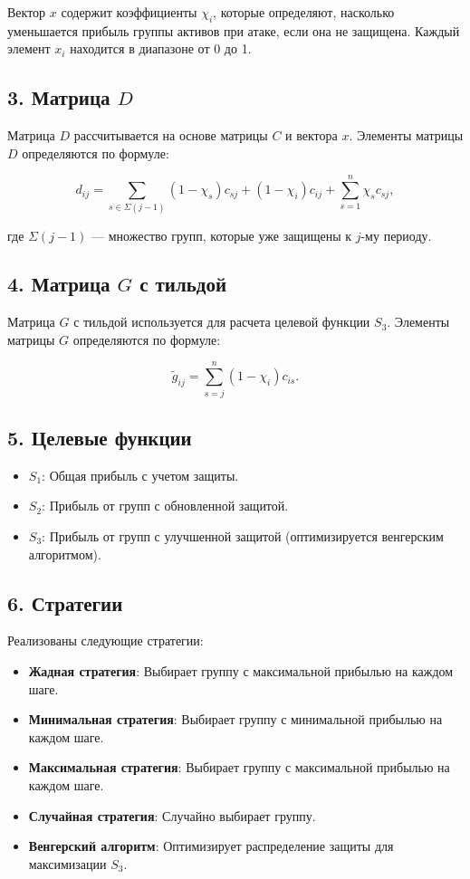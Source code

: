 \documentclass{article}
\begin{document}
Вектор \( x \) содержит коэффициенты \( \chi_i \), которые определяют, насколько уменьшается прибыль группы активов при атаке, если она не защищена. Каждый элемент \( x_i \) находится в диапазоне от 0 до 1.

\subsection*{3. Матрица \( D \)}

Матрица \( D \) рассчитывается на основе матрицы \( C \) и вектора \( x \). Элементы матрицы \( D \) определяются по формуле:

\[
d_{ij} = \sum_{s \in \Sigma(j-1)} (1 - \chi_s)c_{sj} + (1 - \chi_i)c_{ij} + \sum_{s=1}^n \chi_s c_{sj},
\]

где \( \Sigma(j-1) \) — множество групп, которые уже защищены к \( j \)-му периоду.

\subsection*{4. Матрица \( G \) с тильдой}

Матрица \( G \) с тильдой используется для расчета целевой функции \( S_3 \). Элементы матрицы \( G \) определяются по формуле:

\[
\widetilde{g}_{ij} = \sum_{s=j}^{n} (1 - \chi_i)c_{is}.
\]

\subsection*{5. Целевые функции}

\begin{itemize}
    \item \( S_1 \): Общая прибыль с учетом защиты.
    \item \( S_2 \): Прибыль от групп с обновленной защитой.
    \item \( S_3 \): Прибыль от групп с улучшенной защитой (оптимизируется венгерским алгоритмом).
\end{itemize}

\subsection*{6. Стратегии}

Реализованы следующие стратегии:
\begin{itemize}
    \item \textbf{Жадная стратегия}: Выбирает группу с максимальной прибылью на каждом шаге.
    \item \textbf{Минимальная стратегия}: Выбирает группу с минимальной прибылью на каждом шаге.
    \item \textbf{Максимальная стратегия}: Выбирает группу с максимальной прибылью на каждом шаге.
    \item \textbf{Случайная стратегия}: Случайно выбирает группу.
    \item \textbf{Венгерский алгоритм}: Оптимизирует распределение защиты для максимизации \( S_3 \).
\end{itemize}
\end{document}
